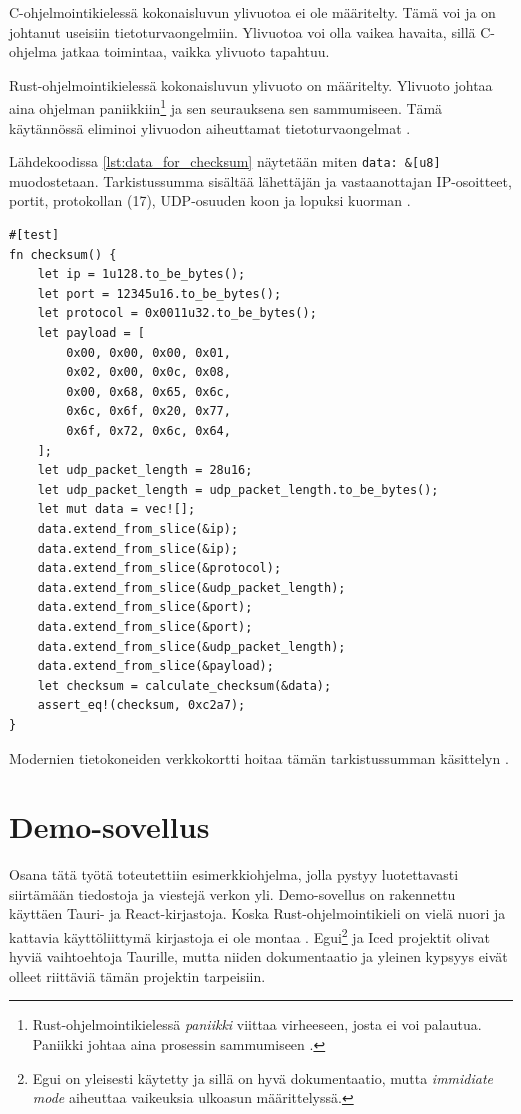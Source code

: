\documentclass[a4paper,12pt]{article}
\begin{document}
    C-ohjelmointikielessä kokonaisluvun ylivuotoa ei ole määritelty. Tämä voi ja on johtanut useisiin tietoturvaongelmiin. Ylivuotoa voi olla vaikea havaita, sillä C-ohjelma jatkaa toimintaa, vaikka ylivuoto tapahtuu.\par
    Rust-ohjelmointikielessä kokonaisluvun ylivuoto on määritelty. Ylivuoto johtaa aina ohjelman paniikkiin\footnote{Rust-ohjelmointikielessä \textit{paniikki} viittaa virheeseen, josta ei voi palautua. Paniikki johtaa aina prosessin sammumiseen \cite[luku 9.3]{rust-book}.} ja sen seurauksena sen sammumiseen. Tämä käytännössä eliminoi ylivuodon aiheuttamat tietoturvaongelmat \cite[luku 3.2]{rust-book}.

    Lähdekoodissa \ref{lst:data_for_checksum} näytetään miten \lstinline{data: &[u8]} muodostetaan. Tarkistussumma sisältää lähettäjän ja vastaanottajan IP-osoitteet, portit, protokollan (17), UDP-osuuden koon ja lopuksi kuorman \cite{RFC-768, protocol-numbers}. \par

        \begin{lstlisting}[caption={Tietojen kasaaminen tarkistussummaa varten}, label={lst:data_for_checksum}]
#[test]
fn checksum() {
    let ip = 1u128.to_be_bytes();
    let port = 12345u16.to_be_bytes();
    let protocol = 0x0011u32.to_be_bytes();
    let payload = [
        0x00, 0x00, 0x00, 0x01,
        0x02, 0x00, 0x0c, 0x08,
        0x00, 0x68, 0x65, 0x6c,
        0x6c, 0x6f, 0x20, 0x77,
        0x6f, 0x72, 0x6c, 0x64,
    ];
    let udp_packet_length = 28u16;
    let udp_packet_length = udp_packet_length.to_be_bytes();
    let mut data = vec![];
    data.extend_from_slice(&ip);
    data.extend_from_slice(&ip);
    data.extend_from_slice(&protocol);
    data.extend_from_slice(&udp_packet_length);
    data.extend_from_slice(&port);
    data.extend_from_slice(&port);
    data.extend_from_slice(&udp_packet_length);
    data.extend_from_slice(&payload);
    let checksum = calculate_checksum(&data);
    assert_eq!(checksum, 0xc2a7);
}\end{lstlisting}

    Modernien tietokoneiden verkkokortti hoitaa tämän tarkistussumman käsittelyn \cite{VivianoTCP/IPLearn}.


    \section{Demo-sovellus}\label{sec:demo}

    Osana tätä työtä toteutettiin esimerkkiohjelma, jolla pystyy luotettavasti siirtämään tiedostoja ja viestejä verkon yli. Demo-sovellus on rakennettu käyttäen Tauri- ja React-kirjastoja. Koska Rust-ohjelmointikieli on vielä nuori ja kattavia käyttöliittymä kirjastoja ei ole montaa \cite{AreYet}. 
    Egui\footnote{Egui on yleisesti käytetty ja sillä on hyvä dokumentaatio, mutta \textit{immidiate mode} aiheuttaa vaikeuksia ulkoasun määrittelyssä. } ja Iced projektit olivat hyviä vaihtoehtoja Taurille, mutta niiden dokumentaatio ja yleinen kypsyys eivät olleet riittäviä tämän projektin tarpeisiin. \par
\end{document}
